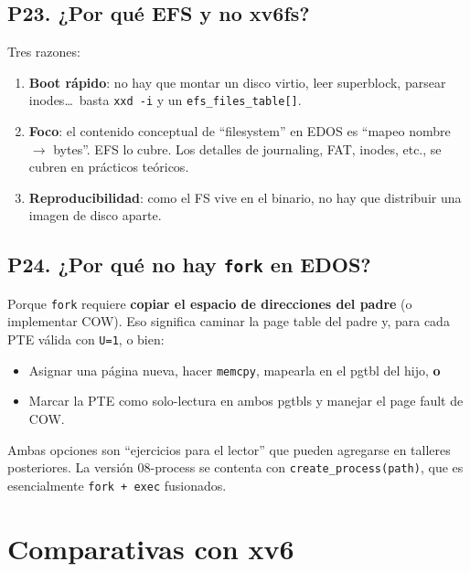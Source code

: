 \documentclass[11pt,a4paper]{article}
\begin{document}
\subsection*{P23. ¿Por qué EFS y no xv6fs?}

\begin{respuesta}
Tres razones:

\begin{enumerate}[nosep,leftmargin=*]
    \item \textbf{Boot rápido}: no hay que montar un disco virtio,
        leer superblock, parsear inodes\dots\ basta \texttt{xxd
        -i} y un \texttt{efs\_files\_table[]}.
    \item \textbf{Foco}: el contenido conceptual de ``filesystem''
        en EDOS es ``mapeo nombre $\to$ bytes''. EFS lo cubre. Los
        detalles de journaling, FAT, inodes, etc., se cubren en
        prácticos teóricos.
    \item \textbf{Reproducibilidad}: como el FS vive en el binario,
        no hay que distribuir una imagen de disco aparte.
\end{enumerate}
\end{respuesta}

\subsection*{P24. ¿Por qué no hay \texttt{fork} en EDOS?}

\begin{respuesta}
Porque \texttt{fork} requiere \textbf{copiar el espacio de
direcciones del padre} (o implementar COW). Eso significa caminar
la page table del padre y, para cada PTE válida con \texttt{U=1},
o bien:

\begin{itemize}[nosep,leftmargin=*]
    \item Asignar una página nueva, hacer \texttt{memcpy}, mapearla
        en el pgtbl del hijo, \textbf{o}
    \item Marcar la PTE como solo-lectura en ambos pgtbls y manejar
        el page fault de COW.
\end{itemize}

Ambas opciones son ``ejercicios para el lector'' que pueden
agregarse en talleres posteriores. La versión 08-process se
contenta con \texttt{create\_process(path)}, que es esencialmente
\texttt{fork + exec} fusionados.
\end{respuesta}

\section{Comparativas con xv6}
\end{document}

